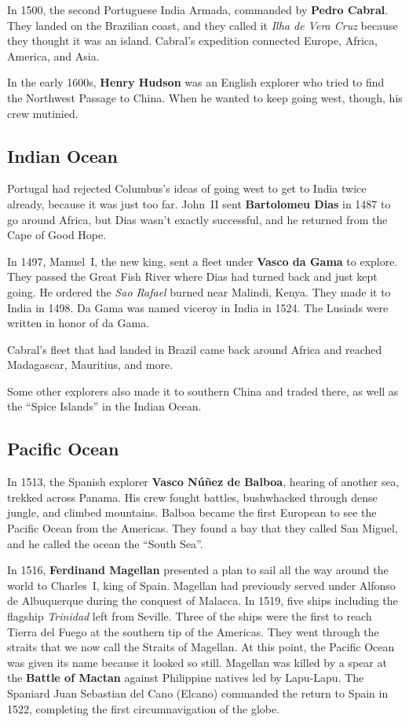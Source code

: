 In 1500, the second Portuguese India Armada, commanded by \textbf{Pedro Cabral}.
They landed on the Brazilian coast,
and they called it \textit{Ilha de Vera Cruz} because they thought it was an island.
Cabral's expedition connected Europe, Africa, America, and Asia.

In the early 1600s,
\textbf{Henry Hudson} was an English explorer who tried to find the Northwest Passage to China.
When he wanted to keep going west, though, his crew mutinied.

\subsection*{Indian Ocean}

Portugal had rejected Columbus's ideas of going west to get to India twice already,
because it was just too far.
John~II sent \textbf{Bartolomeu Dias} in 1487 to go around Africa,
but Dias wasn't exactly successful, and he returned from the Cape of Good Hope.

In 1497, Manuel~I, the new king, sent a fleet under \textbf{Vasco da Gama} to explore.
They passed the Great Fish River where Dias had turned back and just kept going.
He ordered the \textit{Sao Rafael} burned near Malindi, Kenya.
They made it to India in 1498.
Da Gama was named viceroy in India in 1524.
The Lusiads were written in honor of da Gama.

Cabral's fleet that had landed in Brazil came back around Africa
and reached Madagascar, Mauritius, and more.

Some other explorers also made it to southern China and traded there,
as well as the ``Spice Islands'' in the Indian Ocean.

\subsection*{Pacific Ocean}

In 1513, the Spanish explorer \textbf{Vasco N\'u\~nez de Balboa},
hearing of another sea, trekked across Panama.
His crew fought battles, bushwhacked through dense jungle, and climbed mountains.
Balboa became the first European to see the Pacific Ocean from the Americas.
They found a bay that they called San Miguel, and he called the ocean the ``South Sea''.

In 1516, \textbf{Ferdinand Magellan} presented a plan
to sail all the way around the world to Charles~I, king of Spain.
Magellan had previously served under Alfonso de Albuquerque during the conquest of Malacca.
In 1519, five ships including the flagship \textit{Trinidad} left from Seville.
Three of the ships were the first to reach Tierra del Fuego at the southern tip of the Americas.
They went through the straits that we now call the Straits of Magellan.
At this point, the Pacific Ocean was given its name because it looked so still.
Magellan was killed by a spear
at the \textbf{Battle of Mactan} against Philippine natives led by Lapu-Lapu.
The Spaniard Juan Sebastian del Cano (Elcano) commanded the return to Spain in 1522,
completing the first circumnavigation of the globe.

